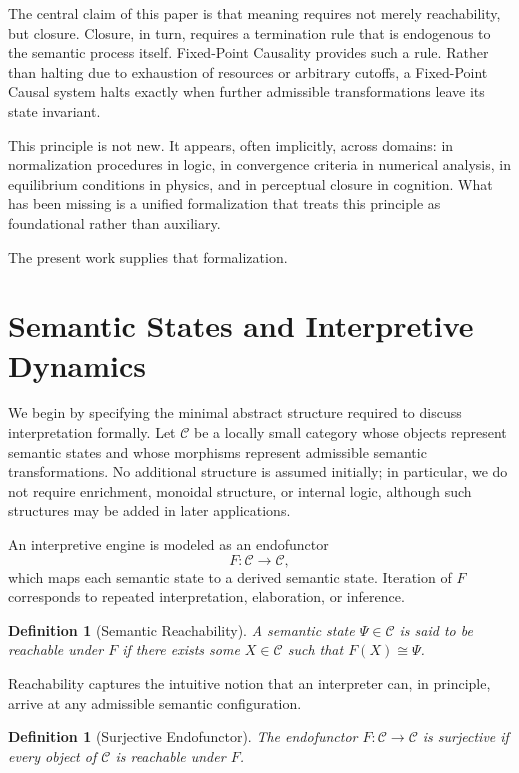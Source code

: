 \documentclass[12pt]{article}
\newtheorem{definition}[theorem]{Definition}
\theoremstyle{remark}
\begin{document}
The central claim of this paper is that meaning requires not merely reachability, but closure. Closure, in turn, requires a termination rule that is endogenous to the semantic process itself. Fixed-Point Causality provides such a rule. Rather than halting due to exhaustion of resources or arbitrary cutoffs, a Fixed-Point Causal system halts exactly when further admissible transformations leave its state invariant.

This principle is not new. It appears, often implicitly, across domains: in normalization procedures in logic, in convergence criteria in numerical analysis, in equilibrium conditions in physics, and in perceptual closure in cognition. What has been missing is a unified formalization that treats this principle as foundational rather than auxiliary.

The present work supplies that formalization.

\section{Semantic States and Interpretive Dynamics}

We begin by specifying the minimal abstract structure required to discuss interpretation formally. Let $\mathcal{C}$ be a locally small category whose objects represent semantic states and whose morphisms represent admissible semantic transformations. No additional structure is assumed initially; in particular, we do not require enrichment, monoidal structure, or internal logic, although such structures may be added in later applications.

An interpretive engine is modeled as an endofunctor
\[
F : \mathcal{C} \to \mathcal{C},
\]
which maps each semantic state to a derived semantic state. Iteration of $F$ corresponds to repeated interpretation, elaboration, or inference.

\begin{definition}[Semantic Reachability]
A semantic state $\Psi \in \mathcal{C}$ is said to be reachable under $F$ if there exists some $X \in \mathcal{C}$ such that $F(X) \cong \Psi$.
\end{definition}

Reachability captures the intuitive notion that an interpreter can, in principle, arrive at any admissible semantic configuration.

\begin{definition}[Surjective Endofunctor]
The endofunctor $F : \mathcal{C} \to \mathcal{C}$ is surjective if every object of $\mathcal{C}$ is reachable under $F$.
\end{definition}
\end{document}
